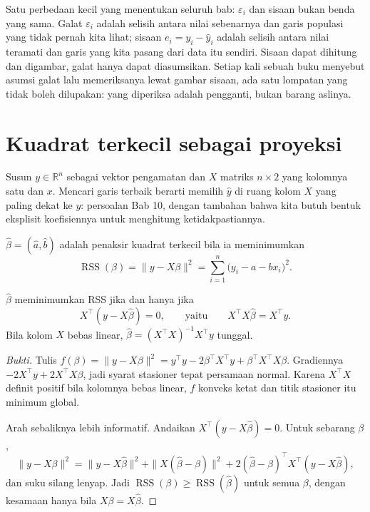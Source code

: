 Satu perbedaan kecil yang menentukan seluruh bab: $\varepsilon_i$ dan sisaan bukan
benda yang sama. Galat $\varepsilon_i$ adalah selisih antara nilai sebenarnya dan garis
populasi yang tidak pernah kita lihat; sisaan $e_i=y_i-\hat y_i$ adalah selisih antara
nilai teramati dan garis yang kita pasang dari data itu sendiri. Sisaan dapat dihitung
dan digambar, galat hanya dapat diasumsikan. Setiap kali sebuah buku menyebut asumsi
galat lalu memeriksanya lewat gambar sisaan, ada satu lompatan yang tidak boleh
dilupakan: yang diperiksa adalah pengganti, bukan barang aslinya.

\section{Kuadrat terkecil sebagai proyeksi}

Susun $y\in\mathbb{R}^n$ sebagai vektor pengamatan dan $X$ matriks $n\times2$ yang
kolomnya satu dan $x$. Mencari garis terbaik berarti memilih $\hat y$ di ruang kolom $X$
yang paling dekat ke $y$: persoalan Bab 10, dengan tambahan bahwa kita butuh bentuk
eksplisit koefisiennya untuk menghitung ketidakpastiannya.

\begin{definisi}
$\hat\beta=(\hat a,\hat b)$ adalah penaksir kuadrat terkecil bila ia meminimumkan
\[
\operatorname{RSS}(\beta)=\|y-X\beta\|^2=\sum_{i=1}^{n}\bigl(y_i-a-bx_i\bigr)^2 .
\]
\end{definisi}


\begin{teorema}
$\hat\beta$ meminimumkan RSS jika dan hanya jika
\[
X^{\top}(y-X\hat\beta)=0 ,
\qquad\text{yaitu}\qquad X^{\top}X\hat\beta=X^{\top}y .
\]
Bila kolom $X$ bebas linear, $\hat\beta=(X^{\top}X)^{-1}X^{\top}y$ tunggal.
\end{teorema}

\begin{proof}[Bukti]
Tulis $f(\beta)=\|y-X\beta\|^2=y^{\top}y-2\beta^{\top}X^{\top}y+\beta^{\top}X^{\top}X\beta$.
Gradiennya $-2X^{\top}y+2X^{\top}X\beta$, jadi syarat stasioner tepat persamaan normal.
Karena $X^{\top}X$ definit positif bila kolomnya bebas linear, $f$ konveks ketat dan
titik stasioner itu minimum global.

Arah sebaliknya lebih informatif. Andaikan $X^{\top}(y-X\hat\beta)=0$. Untuk sebarang
$\beta$,
\[
\|y-X\beta\|^2=\|y-X\hat\beta\|^2+\|X(\hat\beta-\beta)\|^2
+2(\hat\beta-\beta)^{\top}X^{\top}(y-X\hat\beta),
\]
dan suku silang lenyap. Jadi $\operatorname{RSS}(\beta)\ge\operatorname{RSS}(\hat\beta)$
untuk semua $\beta$, dengan kesamaan hanya bila $X\beta=X\hat\beta$.
\end{proof}

